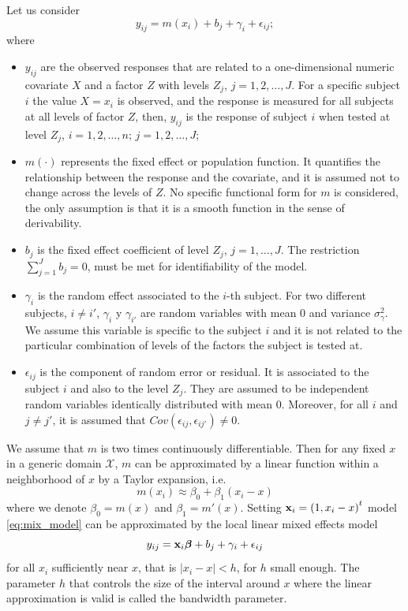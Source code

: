 \documentclass[sn-mathphys]{sn-jnl}%
\def\bbeta{{\boldsymbol{\beta}}}
\theoremstyle{thmstyleone}%
\theoremstyle{thmstyletwo}%
\theoremstyle{thmstylethree}%
\begin{document}
Let us consider 
\begin{equation} \label{eq:mix_model}
	y_{ij} = m(x_i)+ b_{j}+\gamma_{i}+ \epsilon_{ij};
\end{equation}
where 
\begin{itemize}
\item $y_{ij}$ are the observed responses that are related to a one-dimensional numeric covariate $X$ and a factor $Z$ with levels $Z_j$, $j=1,2,\ldots, J$. For a specific subject $i$ the value  $X=x_i$ is observed, and the response is measured for all subjects at all levels of factor $Z$, then, $y_{ij}$ is the response of subject $i$ when tested at level $Z_j$, $i=1,2,\ldots, n$; $j=1,2,\ldots, J$;

\item $m(\cdot)$ represents the fixed effect or population function. It quantifies the relationship between the response and the covariate, and it is assumed not to change across the levels of $Z$. No specific functional form for $m$ is considered, the only assumption is that it is a smooth function in the sense of derivability. 

\item $b_j$ is the fixed effect coefficient of level $Z_j$, $j=1, \ldots, J$. The restriction $\sum_{j=1}^J b_j=0$, must be met for identifiability of the model.

\item $\gamma_i$  is the random effect associated to the $i$-th subject. For two different subjects, $i \neq i'$, $\gamma_i$ y $\gamma_{i'}$ are random variables with mean 0 and variance  $\sigma_{\gamma}^2$. We assume this variable is specific to the  subject $i$ and it is not related to the particular combination of levels of the factors the subject is tested at. 


\item $\epsilon_{ij}$ is the component of random error or residual. It is associated to the subject $i$ and also to the level $Z_j$. They are assumed to be independent random variables identically distributed with mean 0.
Moreover, for all $i$ and $j\neq j'$, it is assumed that $Cov(\epsilon_{ij},\epsilon_{ij'})\neq 0$.
\end{itemize}



We assume that $m$ is two times continuously differentiable. Then for any fixed $x$ in a generic domain $\mathcal{X}$, $m$ can be approximated by a linear function within a neighborhood of $x$ by a Taylor expansion, i.e.
$$m(x_i)\approx \beta_0 +\beta_1(x_i-x)$$
where we denote $\beta_0=m(x)$ and $\beta_1=m'(x)$. Setting ${\bf x}_i=\left(1,x_i-x\right)^t$ model \eqref{eq:mix_model} can be approximated by the local linear mixed effects model
\begin{equation}\label{eq:LLme}
y_{ij} = {\bf x}_i \bbeta + b_j+ \gamma_i + \epsilon_{ij}
\end{equation}
for all $x_i$ sufficiently near $x$, that is $\lvert  x_i-x \lvert  <h$, for $h$ small enough. The parameter $h$ that controls the size of the interval around $x$  where the linear approximation is valid is called the bandwidth parameter. 
\end{document}
